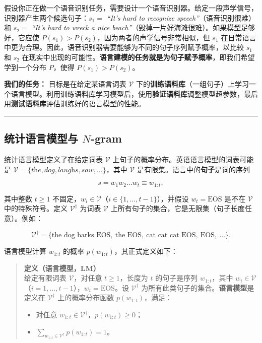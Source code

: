 \documentclass[
  11pt,
  a4paper,
]{article}
\providecommand{\tightlist}{%
  \setlength{\itemsep}{0pt}\setlength{\parskip}{0pt}}
\begin{document}
假设你正在做一个语音识别任务，需要设计一个语音识别器。给定一段声学信号，识别器产生两个候选句子：\(s_1 =\)
\emph{``It's hard to recognize speech''}（语音识别很难）和 \(s_2 =\)
\emph{``It's hard to wreck a nice
beach''}（毁掉一片好海滩很难）。如果模型足够好，它应使
\(P(s_1) > P(s_2)\)，因为两者的声学信号非常相似，但 \(s_1\)
在日常语言中更为合理。因此，语音识别器需要能够为不同的句子序列赋予概率，以比较
\(s_1\) 和 \(s_2\)
在现实中出现的可能性。\textbf{语言建模的任务就是为句子赋予概率}，即我们希望学到一个分布
\(P\)，使得 \(P(s_1) > P(s_2)\)。

\textbf{我们的任务：} 目标是在给定某语言词表 \(\mathcal{V}\)
下的\textbf{训练语料库}（一组句子）上学习一个语言模型。利用训练语料库学习模型后，使用\textbf{验证语料库}调整模型超参数，最后用\textbf{测试语料库}评估训练好的语言模型的性能。

\begin{center}\rule{0.5\linewidth}{0.5pt}\end{center}

\subsection{\texorpdfstring{统计语言模型与
\(N\)-gram}{统计语言模型与 N-gram}}\label{ux7edfux8ba1ux8bedux8a00ux6a21ux578bux4e0e-n-gram}

统计语言模型定义了在给定词表 \(\mathcal{V}\)
上句子的概率分布。英语语言模型的词表可能是
\(\mathcal{V} = \{\textit{the}, \textit{dog}, \textit{laughs}, \textit{saw}, \ldots\}\)，其中
\(\mathcal{V}\) 是有限集。语言中的\textbf{句子}是词的序列

\[s = w_1 w_2 \ldots w_t \equiv w_{1:t},\]

其中整数 \(t \geq 1\)
不固定，\(w_i \in \mathcal{V}\)（\(i \in \{1, \ldots, t-1\}\)），并假设
\(w_t = \text{EOS}\) 是不在 \(\mathcal{V}\) 中的特殊符号。定义
\(\mathcal{V}^{\dagger}\) 为词表 \(\mathcal{V}\)
上所有句子的集合，它是无限集（句子长度任意）。例如：

\[\mathcal{V}^{\dagger} = \{\text{the dog barks EOS},\ \text{the EOS},\ \text{cat cat cat EOS},\ \text{EOS},\ \ldots\}.\]

语言模型计算 \(w_{1:t}\) 的概率 \(p(w_{1:t})\)，其正式定义如下：

\begin{quote}
\textbf{定义（语言模型，LM）}\\
给定有限词表 \(\mathcal{V}\)，对任意 \(t \geq 1\)，长度为 \(t\)
的句子是序列 \(w_{1:t}\)，其中
\(w_i \in \mathcal{V}\)（\(i = 1, \ldots, t-1\)），\(w_t = \text{EOS}\)。设
\(\mathcal{V}^{\dagger}\)
为所有此类句子的集合。\textbf{语言模型}是定义在
\(\mathcal{V}^{\dagger}\) 上的概率分布函数 \(p(w_{1:t})\)，满足：

\begin{itemize}
\tightlist
\item
  对任意 \(w_{1:t} \in \mathcal{V}^{\dagger}\)，\(p(w_{1:t}) \geq 0\)；
\item
  \(\sum_{w_{1:t} \in \mathcal{V}^{\dagger}} p(w_{1:t}) = 1\)。
\end{itemize}
\end{quote}
\end{document}
